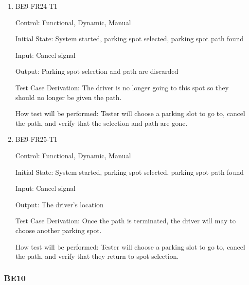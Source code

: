 \documentclass[12pt, titlepage]{article}
\begin{document}
\begin{enumerate}

    \item{BE9-FR24-T1}

    Control: Functional, Dynamic, Manual
    					
    Initial State: System started, parking spot selected, parking spot path
    found
    					
    Input: Cancel signal
    					
    Output: Parking spot selection and path are discarded
    
    Test Case Derivation: The driver is no longer going to this spot so they
    should no longer be given the path.
    					
    How test will be performed: Tester will choose a parking slot to go to,
    cancel the path, and verify that the selection and path are gone.

    \item{BE9-FR25-T1}

    Control: Functional, Dynamic, Manual
    					
    Initial State: System started, parking spot selected, parking spot path
    found
    					
    Input: Cancel signal
    					
    Output: The driver's location
    
    Test Case Derivation: Once the path is terminated, the driver will may to
    choose another parking spot.
    					
    How test will be performed: Tester will choose a parking slot to go to,
    cancel the path, and verify that they return to spot selection.

\end{enumerate}

\subsubsection{BE10}
\end{document}
